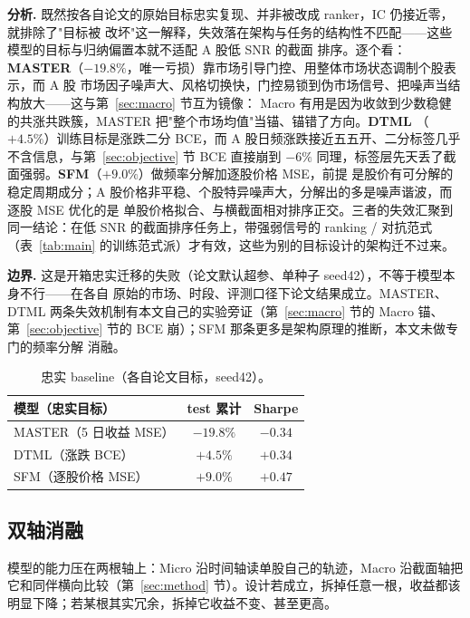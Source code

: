 \documentclass[a4paper,11pt,fontset=fandol]{ctexart}
\begin{document}
\textbf{\heiti 分析.} 既然按各自论文的原始目标忠实复现、并非被改成 ranker，IC 仍接近零，就排除了"目标被
改坏"这一解释，失效落在架构与任务的结构性不匹配——这些模型的目标与归纳偏置本就不适配 A 股低 SNR 的截面
排序。逐个看：\textbf{MASTER}（$-19.8\%$，唯一亏损）靠市场引导门控、用整体市场状态调制个股表示，而 A 股
市场因子噪声大、风格切换快，门控易锁到伪市场信号、把噪声当结构放大——这与第~\ref{sec:macro} 节互为镜像：
Macro 有用是因为收敛到少数稳健的共涨共跌簇，MASTER 把"整个市场均值"当锚、锚错了方向。\textbf{DTML}
（$+4.5\%$）训练目标是涨跌二分 BCE，而 A 股日频涨跌接近五五开、二分标签几乎不含信息，与第~\ref{sec:objective}
节 BCE 直接崩到 $-6\%$ 同理，标签层先天丢了截面强弱。\textbf{SFM}（$+9.0\%$）做频率分解加逐股价格 MSE，前提
是股价有可分解的稳定周期成分；A 股价格非平稳、个股特异噪声大，分解出的多是噪声谐波，而逐股 MSE 优化的是
单股价格拟合、与横截面相对排序正交。三者的失效汇聚到同一结论：在低 SNR 的截面排序任务上，带强弱信号的
ranking / 对抗范式（表~\ref{tab:main} 的训练范式派）才有效，这些为别的目标设计的架构迁不过来。

\textbf{\heiti 边界.} 这是开箱忠实迁移的失败（论文默认超参、单种子 seed42），不等于模型本身不行——在各自
原始的市场、时段、评测口径下论文结果成立。MASTER、DTML 两条失效机制有本文自己的实验旁证（第~\ref{sec:macro}
节的 Macro 锚、第~\ref{sec:objective} 节的 BCE 崩）；SFM 那条更多是架构原理的推断，本文未做专门的频率分解
消融。

\begin{table}[H]
\centering
\caption{忠实 baseline（各自论文目标，seed42）。}
\label{tab:faithful}
\begin{tabular}{lcc}
\toprule
模型（忠实目标） & test 累计 & Sharpe \\
\midrule
MASTER（5 日收益 MSE） & $-19.8\%$ & $-0.34$ \\
DTML（涨跌 BCE）       & $+4.5\%$  & $+0.34$ \\
SFM（逐股价格 MSE）    & $+9.0\%$  & $+0.47$ \\
\bottomrule
\end{tabular}
\end{table}

\subsection{双轴消融}\label{sec:pillars}
模型的能力压在两根轴上：Micro 沿时间轴读单股自己的轨迹，Macro 沿截面轴把它和同伴横向比较（第~\ref{sec:method}
节）。设计若成立，拆掉任意一根，收益都该明显下降；若某根其实冗余，拆掉它收益不变、甚至更高。
\end{document}
